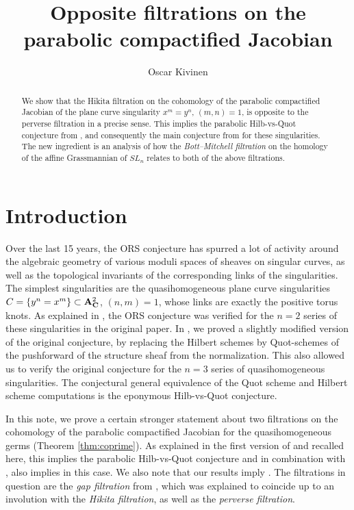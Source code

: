 \documentclass[a4paper,11pt,leqno]{amsart}
\title{Opposite filtrations on the parabolic compactified Jacobian}
\author{Oscar Kivinen}
\begin{document}
\maketitle
\begin{abstract}
We show that the Hikita filtration on the cohomology of the parabolic compactified Jacobian of the plane curve singularity $x^m=y^n$, $(m,n)=1$, is opposite to the perverse filtration in a precise sense. 
This implies the parabolic Hilb-vs-Quot conjecture from \cite{KTpublished}, and consequently the main conjecture from \cite{ORS} for these singularities.
The new ingredient is an analysis of how the {\em Bott--Mitchell filtration} on the homology of the affine Grassmannian of $SL_n$ relates to both of the above filtrations.
\end{abstract}
\tableofcontents

\section{Introduction}
Over the last 15 years, the ORS conjecture \cite[Conjecture 2]{ORS} has spurred a lot of activity around the algebraic geometry of various moduli spaces of sheaves on singular curves, as well as the topological invariants of the corresponding links of the singularities. The simplest singularities are the quasihomogeneous plane curve singularities $C=\{y^n=x^m\}\subset \mathbf{A}^2_\mathbf{C}$, $(n,m)=1$, whose links are exactly the positive torus knots. 
As explained in \cite[\S1.6]{KTpublished}, the ORS conjecture was verified for the $n=2$ series of these singularities in the original paper. In \cite[Theorem 5]{KTpublished}, we proved a slightly modified version of the original conjecture, by replacing the Hilbert schemes by Quot-schemes of the pushforward of the structure sheaf from the normalization. 
This also allowed us to verify the original conjecture for the $n=3$ series of quasihomogeneous singularities. The conjectural general equivalence of the Quot scheme and Hilbert scheme computations is the eponymous Hilb-vs-Quot conjecture.

In this note, we prove a certain stronger statement about two filtrations on the cohomology of the parabolic compactified Jacobian for the quasihomogeneous germs (Theorem \ref{thm:coprime}). As explained in the first version of \cite{KTpublished} and recalled here, this implies the parabolic Hilb-vs-Quot conjecture \cite[Conjecture 2]{KTpublished} and in combination with \cite[Theorem 5(i)]{KTpublished}, also implies \cite[Conjecture 2]{ORS} in this case. We also note that our results imply \cite[Conjecture A.12]{ORS}. The filtrations in question are the {\em gap filtration} from \cite[\S8.2]{KTpublished}, which was explained to coincide up to an involution with the {\em Hikita filtration}, as well as the {\em perverse filtration}.
\end{document}
